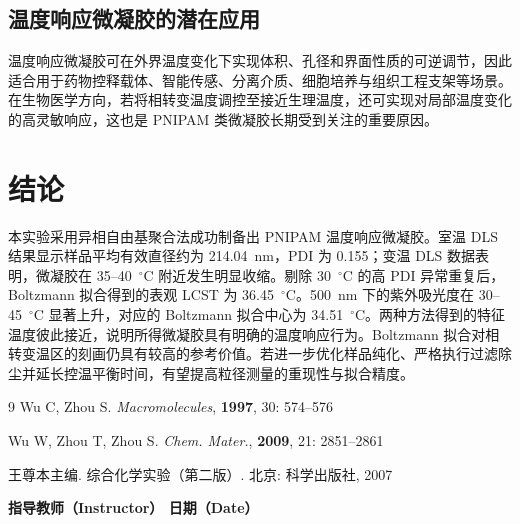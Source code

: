 \documentclass[a4paper]{article}
\newcommand{\zihaoWu}{\fontsize{10.5pt}{16pt}\selectfont}
\begin{document}
\subsection{温度响应微凝胶的潜在应用}

温度响应微凝胶可在外界温度变化下实现体积、孔径和界面性质的可逆调节，因此适合用于药物控释载体、智能传感、分离介质、细胞培养与组织工程支架等场景。在生物医学方向，若将相转变温度调控至接近生理温度，还可实现对局部温度变化的高灵敏响应，这也是 PNIPAM 类微凝胶长期受到关注的重要原因。

\section{结论}
\vspace{-0.5em}

本实验采用异相自由基聚合法成功制备出 PNIPAM 温度响应微凝胶。室温 DLS 结果显示样品平均有效直径约为 214.04~nm，PDI 为 0.155；变温 DLS 数据表明，微凝胶在 35--40~$^{\circ}$C 附近发生明显收缩。剔除 30~$^{\circ}$C 的高 PDI 异常重复后，Boltzmann 拟合得到的表观 LCST 为 36.45~$^{\circ}$C。500~nm 下的紫外吸光度在 30--45~$^{\circ}$C 显著上升，对应的 Boltzmann 拟合中心为 34.51~$^{\circ}$C。两种方法得到的特征温度彼此接近，说明所得微凝胶具有明确的温度响应行为。Boltzmann 拟合对相转变温区的刻画仍具有较高的参考价值。若进一步优化样品纯化、严格执行过滤除尘并延长控温平衡时间，有望提高粒径测量的重现性与拟合精度。

\vspace{3em}

{\footnotesize
	\begin{thebibliography}{9}
		Wu C, Zhou S.
		\textit{Macromolecules}, \textbf{1997}, 30: 574--576

		Wu W, Zhou T, Zhou S.
		\textit{Chem. Mater.}, \textbf{2009}, 21: 2851--2861

		王尊本主编.
		{\kaishu 综合化学实验（第二版）}.
		北京: 科学出版社, 2007
	\end{thebibliography}
}

\vspace*{\fill}
\noindent{\zihaoWu 评语（Remarks）：}

\vspace{2em}

\begin{center}
	{\zihaoWu\bfseries 指导教师（Instructor）\hspace{8em} 日期（Date）}
\end{center}

\vspace{1.5cm}
\end{document}
